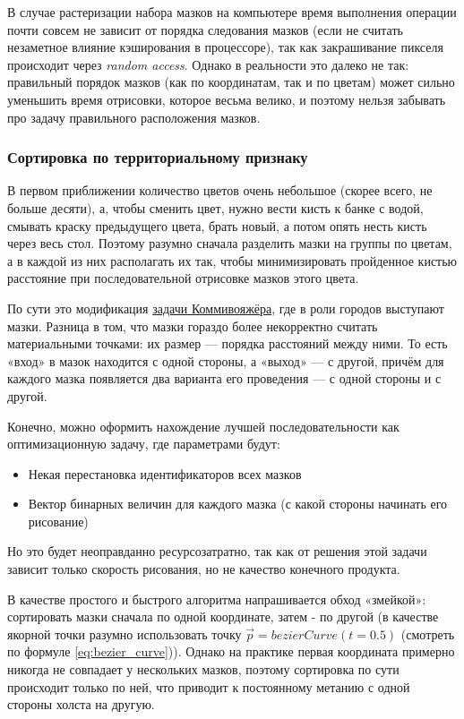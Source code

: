 В случае растеризации набора мазков на компьютере время выполнения операции почти совсем не зависит от порядка следования мазков
(если не считать незаметное влияние кэширования в процессоре), так как закрашивание пикселя происходит через \textit{random access}.
Однако в реальности это далеко не так: правильный порядок мазков (как по координатам, так и по цветам) может сильно уменьшить время отрисовки, которое весьма велико,
и поэтому нельзя забывать про задачу правильного расположения мазков.

\subsubsection{Сортировка по территориальному признаку}
В первом приближении количество цветов очень небольшое (скорее всего, не больше десяти),
а, чтобы сменить цвет, нужно вести кисть к банке с водой, смывать краску предыдущего цвета, брать новый,
а потом опять несть кисть через весь стол.
Поэтому разумно сначала разделить мазки на группы по цветам, а в каждой из них располагать их так,
чтобы минимизировать пройденное кистью расстояние при последовательной отрисовке мазков этого цвета.

По сути это модификация \href{https://en.wikipedia.org/wiki/Travelling_salesman_problem}{задачи Коммивояжёра}, где в роли городов выступают мазки.
Разница в том, что мазки гораздо более некорректно считать материальными точками: их размер — порядка расстояний между ними.
То есть «вход» в мазок находится с одной стороны, а «выход» — с другой, причём для каждого мазка появляется два варианта его проведения —
с одной стороны и с другой.

Конечно, можно оформить нахождение лучшей последовательности как оптимизационную задачу,
где параметрами будут:
\begin{itemize}
    \item Некая перестановка идентификаторов всех мазков
    \item Вектор бинарных величин для каждого мазка (с какой стороны начинать его рисование)
\end{itemize}

Но это будет неоправданно ресурсозатратно, так как от решения этой задачи зависит только скорость рисования, но не качество конечного продукта.

В качестве простого и быстрого алгоритма напрашивается обход «змейкой»: сортировать мазки сначала по одной координате, затем - по другой
(в качестве якорной точки разумно использовать точку $\vec{p} = bezierCurve(t = 0.5)$ (смотреть по формуле \ref{eq:bezier_curve})).
Однако на практике первая координата примерно никогда не совпадает у нескольких мазков, поэтому сортировка по сути происходит только по ней,
что приводит к постоянному метанию с одной стороны холста на другую.

